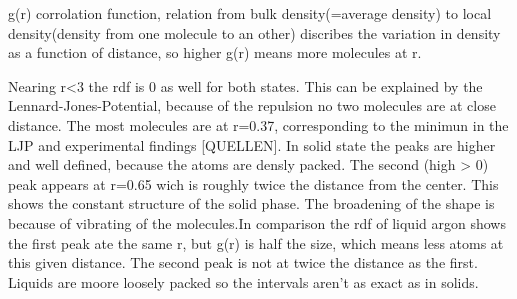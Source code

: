 g(r) corrolation function, relation from bulk density(=average density) to local density(density from one molecule to an other) discribes the variation in density as a function of distance, so higher g(r) means more molecules at r.

Nearing r<3 the rdf is 0 as well for both states. This can be explained by the Lennard-Jones-Potential, because of the repulsion no two molecules are at close distance. The most molecules are at r=0.37, corresponding to the minimun in the LJP and experimental findings [QUELLEN].
In solid state the peaks are higher and well defined, because the atoms are densly packed. The second (high > 0) peak appears at r=0.65 wich is roughly twice the distance from the center. This shows the constant structure of the solid phase. The broadening of the shape is because of vibrating of the molecules.In comparison the rdf of liquid argon shows the first peak ate the same r, but g(r) is half the size, which means less atoms at this given distance. The second peak is not at twice the distance as the first. Liquids are moore loosely packed so the intervals aren't as exact as in solids.

